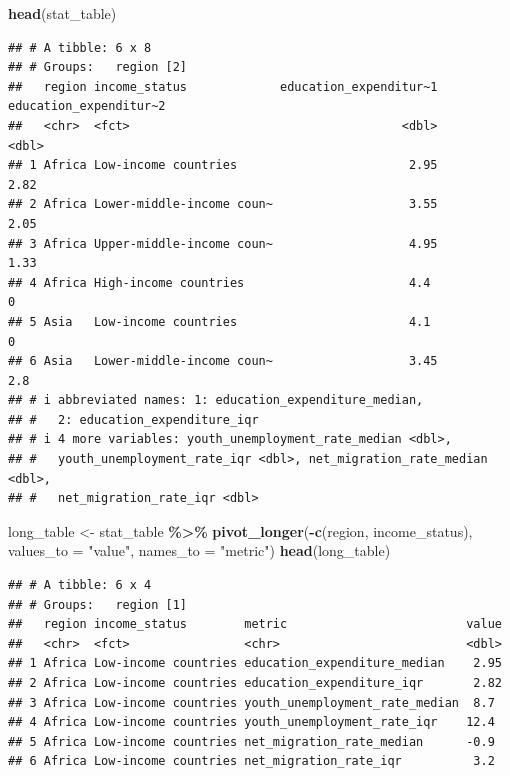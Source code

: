 \documentclass[
]{article}
\newenvironment{Shaded}{\begin{snugshade}}{\end{snugshade}}
\newcommand{\AttributeTok}[1]{\textcolor[rgb]{0.13,0.29,0.53}{#1}}
\newcommand{\FunctionTok}[1]{\textcolor[rgb]{0.13,0.29,0.53}{\textbf{#1}}}
\newcommand{\NormalTok}[1]{#1}
\newcommand{\OtherTok}[1]{\textcolor[rgb]{0.56,0.35,0.01}{#1}}
\newcommand{\SpecialCharTok}[1]{\textcolor[rgb]{0.81,0.36,0.00}{\textbf{#1}}}
\newcommand{\StringTok}[1]{\textcolor[rgb]{0.31,0.60,0.02}{#1}}
\begin{document}
\begin{Shaded}
\begin{Highlighting}[]
\FunctionTok{head}\NormalTok{(stat\_table)}
\end{Highlighting}
\end{Shaded}

\begin{verbatim}
## # A tibble: 6 x 8
## # Groups:   region [2]
##   region income_status             education_expenditur~1 education_expenditur~2
##   <chr>  <fct>                                      <dbl>                  <dbl>
## 1 Africa Low-income countries                        2.95                   2.82
## 2 Africa Lower-middle-income coun~                   3.55                   2.05
## 3 Africa Upper-middle-income coun~                   4.95                   1.33
## 4 Africa High-income countries                       4.4                    0   
## 5 Asia   Low-income countries                        4.1                    0   
## 6 Asia   Lower-middle-income coun~                   3.45                   2.8 
## # i abbreviated names: 1: education_expenditure_median,
## #   2: education_expenditure_iqr
## # i 4 more variables: youth_unemployment_rate_median <dbl>,
## #   youth_unemployment_rate_iqr <dbl>, net_migration_rate_median <dbl>,
## #   net_migration_rate_iqr <dbl>
\end{verbatim}

\begin{Shaded}
\begin{Highlighting}[]
\NormalTok{long\_table }\OtherTok{\textless{}{-}}\NormalTok{ stat\_table }\SpecialCharTok{\%\textgreater{}\%}
  \FunctionTok{pivot\_longer}\NormalTok{(}\SpecialCharTok{{-}}\FunctionTok{c}\NormalTok{(region, income\_status), }\AttributeTok{values\_to =} \StringTok{"value"}\NormalTok{, }\AttributeTok{names\_to =} \StringTok{"metric"}\NormalTok{)}
\FunctionTok{head}\NormalTok{(long\_table)}
\end{Highlighting}
\end{Shaded}

\begin{verbatim}
## # A tibble: 6 x 4
## # Groups:   region [1]
##   region income_status        metric                         value
##   <chr>  <fct>                <chr>                          <dbl>
## 1 Africa Low-income countries education_expenditure_median    2.95
## 2 Africa Low-income countries education_expenditure_iqr       2.82
## 3 Africa Low-income countries youth_unemployment_rate_median  8.7 
## 4 Africa Low-income countries youth_unemployment_rate_iqr    12.4 
## 5 Africa Low-income countries net_migration_rate_median      -0.9 
## 6 Africa Low-income countries net_migration_rate_iqr          3.2
\end{verbatim}
\end{document}
